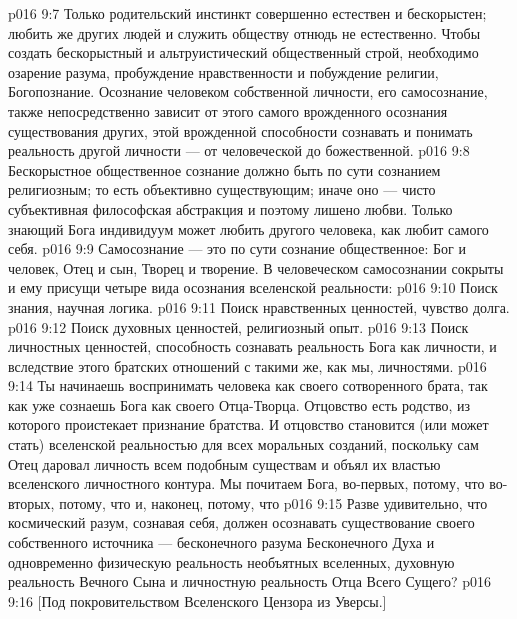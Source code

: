 \vs p016 9:7 \pc Только родительский инстинкт совершенно естествен и бескорыстен; любить же других людей и служить обществу отнюдь не естественно. Чтобы создать бескорыстный и альтруистический общественный строй, необходимо озарение разума, пробуждение нравственности и побуждение религии, Богопознание. Осознание человеком собственной личности, его самосознание, также непосредственно зависит от этого самого врожденного осознания существования других, этой врожденной способности сознавать и понимать реальность другой личности --- от человеческой до божественной.
\vs p016 9:8 Бескорыстное общественное сознание должно быть по сути сознанием религиозным; то есть объективно существующим; иначе оно --- чисто субъективная философская абстракция и поэтому лишено любви. Только знающий Бога индивидуум может любить другого человека, как любит самого себя.
\vs p016 9:9 Самосознание --- это по сути сознание общественное: Бог и человек, Отец и сын, Творец и творение. В человеческом самосознании сокрыты и ему присущи четыре вида осознания вселенской реальности:
\vs p016 9:10 \bibnobreakspace Поиск знания, научная логика.
\vs p016 9:11 \bibnobreakspace Поиск нравственных ценностей, чувство долга.
\vs p016 9:12 \bibnobreakspace Поиск духовных ценностей, религиозный опыт.
\vs p016 9:13 \bibnobreakspace Поиск личностных ценностей, способность сознавать реальность Бога как личности, и вследствие этого братских отношений с такими же, как мы, личностями.
\vs p016 9:14 \pc Ты начинаешь воспринимать человека как своего сотворенного брата, так как уже сознаешь Бога как своего Отца\hyp{}Творца. Отцовство есть родство, из которого проистекает признание братства. И отцовство становится (или может стать) вселенской реальностью для всех моральных созданий, поскольку сам Отец даровал личность всем подобным существам и объял их властью вселенского личностного контура. Мы почитаем Бога, во\hyp{}первых, потому, что  во\hyp{}вторых, потому, что  и, наконец, потому, что 
\vs p016 9:15 Разве удивительно, что космический разум, сознавая себя, должен осознавать существование своего собственного источника --- бесконечного разума Бесконечного Духа и одновременно физическую реальность необъятных вселенных, духовную реальность Вечного Сына и личностную реальность Отца Всего Сущего?
\vsetoff
\vs p016 9:16 [Под покровительством Вселенского Цензора из Уверсы.]
